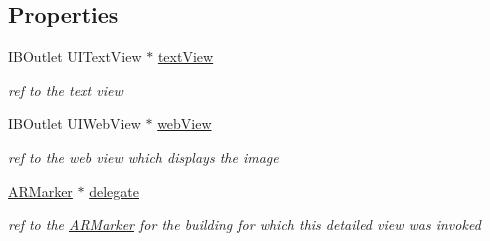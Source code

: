\subsection*{Properties}
\begin{DoxyCompactItemize}
\item 
\hypertarget{interface_a_r_detailed_view_controller_a4fc713afb30abbac758d133a3093fd95}{I\-B\-Outlet U\-I\-Text\-View $\ast$ \hyperlink{interface_a_r_detailed_view_controller_a4fc713afb30abbac758d133a3093fd95}{text\-View}}\label{interface_a_r_detailed_view_controller_a4fc713afb30abbac758d133a3093fd95}

\begin{DoxyCompactList}\small\item\em ref to the text view \end{DoxyCompactList}\item 
\hypertarget{interface_a_r_detailed_view_controller_afbd73894706a75c9fbf68d7b6ff33f6c}{I\-B\-Outlet U\-I\-Web\-View $\ast$ \hyperlink{interface_a_r_detailed_view_controller_afbd73894706a75c9fbf68d7b6ff33f6c}{web\-View}}\label{interface_a_r_detailed_view_controller_afbd73894706a75c9fbf68d7b6ff33f6c}

\begin{DoxyCompactList}\small\item\em ref to the web view which displays the image \end{DoxyCompactList}\item 
\hypertarget{interface_a_r_detailed_view_controller_a9748b771cfc5eccc12ec5abd167317d0}{\hyperlink{interface_a_r_marker}{A\-R\-Marker} $\ast$ \hyperlink{interface_a_r_detailed_view_controller_a9748b771cfc5eccc12ec5abd167317d0}{delegate}}\label{interface_a_r_detailed_view_controller_a9748b771cfc5eccc12ec5abd167317d0}

\begin{DoxyCompactList}\small\item\em ref to the \hyperlink{interface_a_r_marker}{A\-R\-Marker} for the building for which this detailed view was invoked \end{DoxyCompactList}\end{DoxyCompactItemize}


